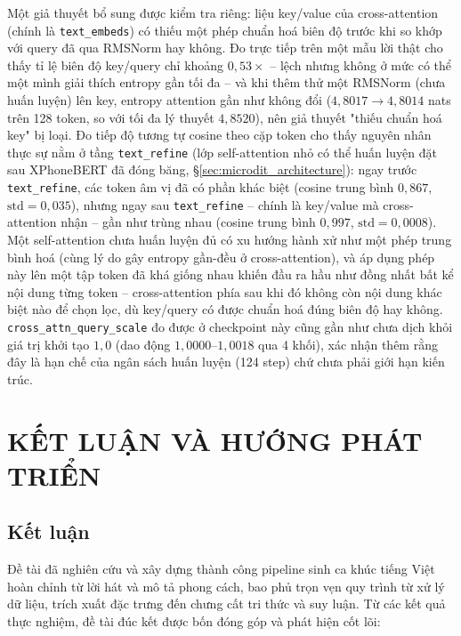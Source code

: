 \documentclass[a4paper,13pt,oneside]{report}
\begin{document}
Một giả thuyết bổ sung được kiểm tra riêng: liệu key/value của cross-attention (chính là
\texttt{text\_embeds}) có thiếu một phép chuẩn hoá biên độ trước khi so khớp với query đã
qua RMSNorm hay không. Đo trực tiếp trên một mẫu lời thật cho thấy tỉ lệ biên độ key/query
chỉ khoảng $0{,}53\times$ -- lệch nhưng không ở mức có thể một mình giải thích entropy gần
tối đa -- và khi thêm thử một RMSNorm (chưa huấn luyện) lên key, entropy attention gần như
không đổi ($4{,}8017\to4{,}8014$ nats trên 128 token, so với tối đa lý thuyết $4{,}8520$),
nên giả thuyết "thiếu chuẩn hoá key" bị loại. Đo tiếp độ tương tự cosine theo cặp token cho
thấy nguyên nhân thực sự nằm ở tầng \texttt{text\_refine} (lớp self-attention nhỏ có thể
huấn luyện đặt sau XPhoneBERT đã đóng băng, \S\ref{sec:microdit_architecture}): ngay trước
\texttt{text\_refine}, các token âm vị đã có phần khác biệt (cosine trung bình $0{,}867$,
$\text{std}=0{,}035$), nhưng ngay sau \texttt{text\_refine} -- chính là key/value mà
cross-attention nhận -- gần như trùng nhau (cosine trung bình $0{,}997$,
$\text{std}=0{,}0008$). Một self-attention chưa huấn luyện đủ có xu hướng hành xử như một
phép trung bình hoá (cùng lý do gây entropy gần-đều ở cross-attention), và áp dụng phép này
lên một tập token đã khá giống nhau khiến đầu ra hầu như đồng nhất bất kể nội dung từng
token -- cross-attention phía sau khi đó không còn nội dung khác biệt nào để chọn lọc, dù
key/query có được chuẩn hoá đúng biên độ hay không. \texttt{cross\_attn\_query\_scale} đo
được ở checkpoint này cũng gần như chưa dịch khỏi giá trị khởi tạo $1{,}0$ (dao động
$1{,}0000$--$1{,}0018$ qua 4 khối), xác nhận thêm rằng đây là hạn chế của ngân sách huấn
luyện (124 step) chứ chưa phải giới hạn kiến trúc.

\chapter{KẾT LUẬN VÀ HƯỚNG PHÁT TRIỂN}
\label{chapter:conclusion}

\section{Kết luận}

Đề tài đã nghiên cứu và xây dựng thành công pipeline sinh ca khúc tiếng Việt hoàn chỉnh từ lời hát và mô tả phong cách, bao phủ trọn vẹn quy trình từ xử lý dữ liệu, trích xuất đặc trưng đến chưng cất tri thức và suy luận. Từ các kết quả thực nghiệm, đề tài đúc kết được bốn đóng góp và phát hiện cốt lõi:
\end{document}
